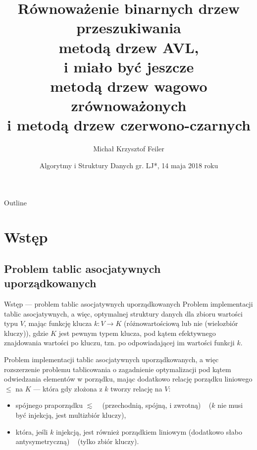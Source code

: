 \documentclass{beamer}
\title[Metody drzew AVL i niedokończone czerwono-czarnych]{Równoważenie binarnych drzew przeszukiwania \\ metodą drzew AVL,\\ i miało być jeszcze\\ metodą drzew wagowo zrównoważonych \\ i metodą drzew czerwono-czarnych}
\author[Michał K. Feiler]{Michał Krzysztof Feiler}
\date{Algorytmy i Struktury Danych gr. LJ*, 14 maja 2018 roku}
\begin{document}
\begin{frame}
  \titlepage
\end{frame}

\begin{frame}{Outline}
  \tableofcontents
\end{frame}

\section{Wstęp}

\subsection{Problem tablic asocjatywnych uporządkowanych}

\begin{frame}{Wstęp --- problem tablic asocjatywnych uporządkowanych}
	Problem implementacji tablic asocjatywnych, a więc, optymalnej struktury danych dla
    zbioru wartości typu $V$, mając funkcję klucza
    $k : V \rightarrow K$ (różnowartościową lub nie (wielozbiór kluczy)), 
    gdzie $K$ jest pewnym typem klucza, pod kątem
    efektywnego znajdowania wartości po kluczu, 
    tzn. po odpowiadającej im wartości funkcji $k$.
    
    \vspace{0.25cm}
    
    Problem implementacji tablic asocjatywnych uporządkowanych, a więc rozszerzenie
    problemu tablicowania o zagadnienie optymalizacji pod kątem odwiedzania
    elementów w porządku, mając dodatkowo relację porządku liniowego $\leq$ na $K$ —
    która gdy złożona z $k$ tworzy relację na $V$:
    \begin{itemize}
    \item spójnego praporządku $\lesssim$ ~ 
    (przechodnią, spójną, i zwrotną) ~ 
    ($k$ nie musi być injekcją, jest multizbiór kluczy),
    \item która, jeśli $k$ injekcją, jest również porządkiem liniowym 
    (dodatkowo słabo antysymetryczną) ~ (tylko zbiór kluczy).
    \end{itemize}
\end{frame}
\end{document}
